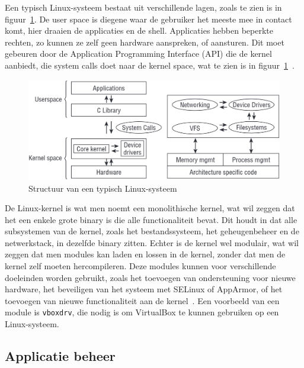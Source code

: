 Een typisch Linux-systeem bestaat uit verschillende lagen, zoals te zien is in figuur~\ref{fig:linux-system-structure}.
De user space is diegene waar de gebruiker het meeste mee in contact komt, hier draaien de applicaties en de shell.
Applicaties hebben beperkte rechten, zo kunnen ze zelf geen hardware aanspreken, of aansturen.
Dit moet gebeuren door de Application Programming Interface (API) die de kernel aanbiedt, die system calls doet naar de kernel space, wat te zien is in figuur~\ref{fig:linux-system-structure}~\autocite{mauerer2008linux}.

\begin{figure}[h!]
    \begin{center}
        \includegraphics[width=\textwidth]
        {./graphics/linux/kernel-structure.png}
        \caption[Structuur van Linux-systeem.]{\label{fig:linux-system-structure}Structuur van een typisch Linux-systeem~\autocite{mauerer2008linux}}
    \end{center}
\end{figure}

De Linux-kernel is wat men noemt een monolithische kernel, wat wil zeggen dat het een enkele grote binary is die alle functionaliteit bevat.
Dit houdt in dat alle subsystemen van de kernel, zoals het bestandssysteem, het geheugenbeheer en de netwerkstack, in dezelfde binary zitten.
Echter is de kernel wel modulair, wat wil zeggen dat men modules kan laden en lossen in de kernel, zonder dat men de kernel zelf moeten hercompileren.
Deze modules kunnen voor verschillende doeleinden worden gebruikt, zoals het toevoegen van ondersteuning voor nieuwe hardware, het beveiligen van het systeem met SELinux of AppArmor, of het toevoegen van nieuwe functionaliteit aan de kernel~\autocite{hypponen2021securing}.
Een voorbeeld van een module is \texttt{vboxdrv}, die nodig is om VirtualBox te kunnen gebruiken op een Linux-systeem.

\subsection{Applicatie beheer}
\label{linux_applicatie_beheer}

